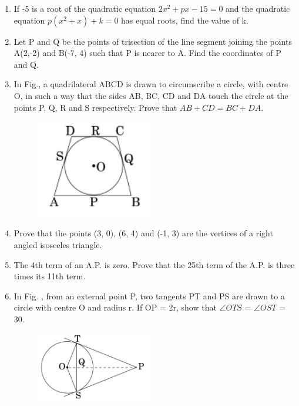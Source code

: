 \documentclass[journal,12pt,twocolumn]{IEEEtran}
\begin{document}
\begin{enumerate}
\item If -5 is a root of the quadratic equation $2x^2+px-15=0$ and the quadratic equation $ p\left(x^2+x\right)+k=0 $ has equal roots, find the value of k. \\

\item  Let P and Q be the points of trisection of the line segment joining the points A(2,-2) and B(-7, 4) such that P is nearer to A. Find the coordinates of P and Q.\\

\item  In Fig., a quadrilateral ABCD is drawn to circumscribe a circle, with centre O, in such a way that the sides AB, BC, CD and DA touch the circle at the points P, Q, R and S respectively. Prove that $ AB + CD= BC + DA $.\\
	\begin{figure}[H]
\centering
      \includegraphics[width=5cm]{2.png}
      \label{fig:my_label}
\end{figure} 

\item  Prove that the points (3, 0), (6, 4) and (-1, 3) are the vertices of a right angled isosceles triangle.\\

\item  The 4th term of an A.P. is zero. Prove that the 25th term of the A.P. is three times its 11th term.\\


\item  In Fig. , from an external point P, two tangents PT and PS are drawn to a circle with centre O and radius r. If OP = 2r, show that $\angle OTS $ = $\angle OST $ = 30\degree.

	\begin{figure}[H]
      \centering
      \includegraphics[width=5cm]{3.png}
      \label{fig:my_label}
   \end{figure} 

\end{enumerate}
\end{document}
